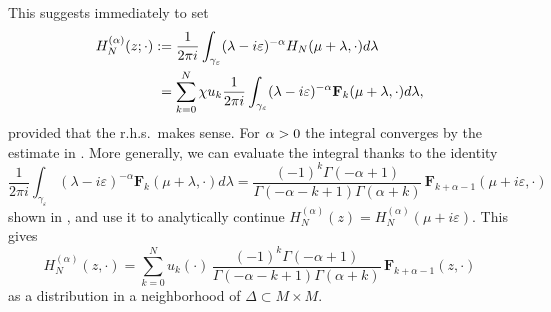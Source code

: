 \documentclass[10pt]{amsart}
\theoremstyle{definition}
\let\cv\alpha
\let\varm k
\let\Re\relax
\DeclareMathOperator{\Re}{Re}
\newcommand*{\defeq}{:=}
\begin{document}
This suggests immediately to set
\[
\begin{aligned}
H_N^{(\cv)}(z;\cdot)&\defeq \frac{1}{2\pi i}\int_{\gamma_\varepsilon} (\lambda-i\varepsilon)^{-\cv} H_N(\mu+\lambda,\cdot) d\lambda \\
& \hphantom{:}=\sum_{\varm=0}^N \chi u_\varm\frac{1}{2\pi i}\int_{\gamma_{\varepsilon}}(\lambda-i\varepsilon)^{-\cv} \mathbf{F}_\varm(\mu+\lambda,\cdot) d\lambda,
\end{aligned}
\]
provided that the r.h.s.~makes sense. For $\Re \cv >0$ the integral converges by the estimate in \cite[Lem.\,6.1]{Dang2020}. More generally, we can evaluate the integral thanks to the identity
\[
\frac{1}{2\pi i}\int_{\gamma_\varepsilon}(\lambda-i\varepsilon)^{-\cv} \mathbf{F}_\varm(\mu+\lambda,\cdot) d\lambda =\frac{(-1)^\varm\Gamma(-\cv+1)}{\Gamma(-\cv-\varm+1)\Gamma(\cv+\varm)}\, \mathbf{F}_{\varm+\cv-1}(\mu+i\varepsilon,\cdot)
\]
shown in \cite[\S7.1]{Dang2020}, and use it to analytically continue $H_N^{(\cv)}(z)=H_N^{(\cv)}(\mu+i\varepsilon)$. This gives
\[
H_N^{(\cv)}(z,\cdot) =
\sum_{\varm=0}^N u_\varm(\cdot)\,\frac{(-1)^\varm\Gamma(-\cv+1)}{\Gamma(-\cv-\varm+1)\Gamma(\cv+\varm)}\, \mathbf{F}_{\varm+\cv-1}(z,\cdot)
\]
as a distribution in a neighborhood of $\Delta\subset M\times M$.
\end{document}
